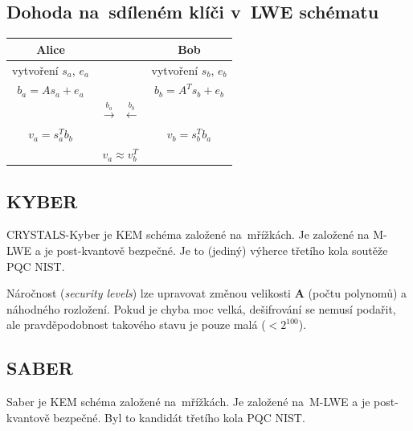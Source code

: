 \subsection{Dohoda na~sdíleném klíči v~LWE schématu}

\begin{table}[ht]
    \centering
    \begin{tabular}{ccc}
    Alice & & Bob \\
    \hline
    vytvoření $s_a$, $e_a$ & & vytvoření $s_b$, $e_b$ \\
    $b_a = As_a + e_a$ & & $b_b = A^Ts_b + e_b$ \\
    & $\stackrel{b_a}{\longrightarrow} \ \ \stackrel{b_b}{\longleftarrow}$ & \\
    $v_a = s_a^T b_b$ & & $v_b = s_b^T b_a$ \\
    & $v_a \approx v_b^T$ & \\
    \end{tabular}
\end{table}
\FloatBarrier

\subsection{KYBER}

CRYSTALS-Kyber je KEM schéma založené na~mřížkách.
Je založené na M-LWE a je post-kvantově bezpečné.
Je to (jediný) výherce třetího kola soutěže PQC NIST.

Náročnost (\emph{security levels}) lze upravovat změnou velikosti \textbf{A} (počtu polynomů) a náhodného rozložení.
Pokud je chyba moc velká, dešifrování se nemusí podařit, ale pravděpodobnost takového stavu je pouze malá ($< 2^{100}$).

\subsection{SABER}

Saber je KEM schéma založené na~mřížkách.
Je založené na~M-LWE a je post-kvantově bezpečné.
Byl to kandidát třetího kola PQC NIST.

